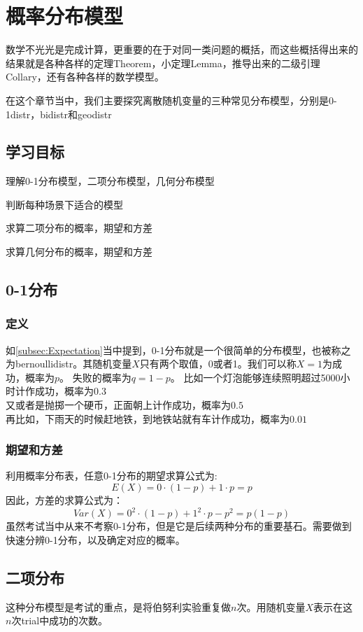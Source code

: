 \chapter{概率分布模型}
数学不光光是完成计算，更重要的在于对同一类问题的概括，而这些概括得出来的结果就是各种各样的定理Theorem，小定理Lemma，推导出来的二级引理Collary，还有各种各样的数学模型。

在这个章节当中，我们主要探究离散随机变量的三种常见分布模型，分别是\gls{0-1distr}，\gls{bidistr}和\gls{geodistr}

\section*{学习目标}
\begin{todolist}
	\item 理解0-1分布模型，二项分布模型，几何分布模型
	\item 判断每种场景下适合的模型
	\item 求算二项分布的概率，期望和方差
	\item 求算几何分布的概率，期望和方差
\end{todolist}
\clearpage

\section{0-1分布}
\subsection*{定义}
如\ref{subsec:Expectation}当中提到，0-1分布就是一个很简单的分布模型，也被称之为\gls{bernoullidistr}。其随机变量$X$只有两个取值，0或者1。我们可以称$X=1$为成功，概率为$p$。 失败的概率为$q=1-p$。
比如一个灯泡能够连续照明超过5000小时计作成功，概率为$0.3$\\
又或者是抛掷一个硬币，正面朝上计作成功，概率为$0.5$\\
再比如，下雨天的时候赶地铁，到地铁站就有车计作成功，概率为$0.01$
\subsection*{期望和方差}
利用概率分布表，任意0-1分布的期望求算公式为:
\[
	E(X)=0\cdot (1-p) +1 \cdot p = p
\]
因此，方差的求算公式为：
\[
	Var(X) = 0^2\cdot (1-p) +1^2 \cdot p - p^2=p(1-p)
\]
虽然考试当中从来不考察0-1分布，但是它是后续两种分布的重要基石。需要做到快速分辨0-1分布，以及确定对应的概率。
\clearpage

\section{二项分布}
这种分布模型是考试的重点，是将伯努利实验重复做$n$次。用随机变量$X$表示在这$n$次\gls{trial}中成功的次数。

